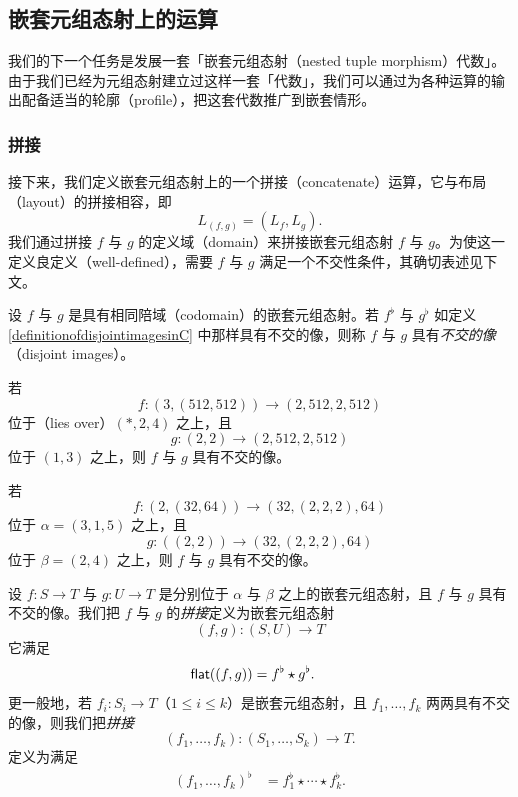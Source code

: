 \subsection{嵌套元组态射上的运算}
我们的下一个任务是发展一套「嵌套元组态射（nested tuple morphism）代数」。由于我们已经为元组态射建立过这样一套「代数」，我们可以通过为各种运算的输出配备适当的轮廓（profile），把这套代数推广到嵌套情形。



\subsubsection{拼接}

接下来，我们定义嵌套元组态射上的一个拼接（concatenate）运算，它与布局（layout）的拼接相容，即
\[
L_{(f,g)} = (L_f,L_g).
\]
我们通过拼接 $f$ 与 $g$ 的定义域（domain）来拼接嵌套元组态射 $f$ 与 $g$。为使这一定义良定义（well-defined），需要 $f$ 与 $g$ 满足一个不交性条件，其确切表述见下文。

\begin{definition}\label{definitionofdisjointimagesinD} 设 $f$ 与 $g$ 是具有相同陪域（codomain）的嵌套元组态射。若 $f^\flat$ 与 $g^\flat$ 如定义 \ref{definitionofdisjointimagesinC} 中那样具有不交的像，则称 $f$ 与 $g$ 具有{\it 不交的像}（disjoint images）。
\end{definition}

\begin{example}
\label{exampleofdisjointimagesinD1}
    若
    \[
    f:(3,(512,512)) \to (2,512,2,512)
    \]
    位于（lies over）$(*,2,4)$ 之上，且
    \[
    g:(2,2) \to (2,512,2,512)
    \]
    位于 $(1,3)$ 之上，则 $f$ 与 $g$ 具有不交的像。
\end{example}

\begin{example}
\label{exampleofdisjointimagesinD2}
若
\[f : (2,(32,64)) \to (32,(2,2,2),64)\]
位于 $\alpha = (3,1,5)$ 之上，且
\[g:((2,2)) \to (32,(2,2,2),64)\]
位于 $\beta = (2,4)$ 之上，则 $f$ 与 $g$ 具有不交的像。
\end{example}


\begin{construction}\label{concatenationofmorphismsinD}
    设 $f:S \to T$ 与 $g:U \to T$ 是分别位于 $\alpha$ 与 $\beta$ 之上的嵌套元组态射，且 $f$ 与 $g$ 具有不交的像。我们把 $f$ 与 $g$ 的{\it 拼接}定义为嵌套元组态射
    \[
    (f,g) : (S,U) \to T
    \]
    它满足
    \begin{align*}
        \mathsf{flat}((f,g)) & = f^\flat \star g^\flat.
    \end{align*}
    更一般地，若 $f_i:S_i \to T$（$1 \leq i \leq k$）是嵌套元组态射，且 $f_1,\dots,f_k$ 两两具有不交的像，则我们把{\it 拼接}
    \[
    (f_1,\dots,f_k) : (S_1 , \dots , S_k) \to T.
    \]
    定义为满足
    \begin{align*}
        (f_1, \dots , f_k)^\flat & = f_1^\flat \star \cdots \star f_k^\flat.
    \end{align*}

\end{construction}

